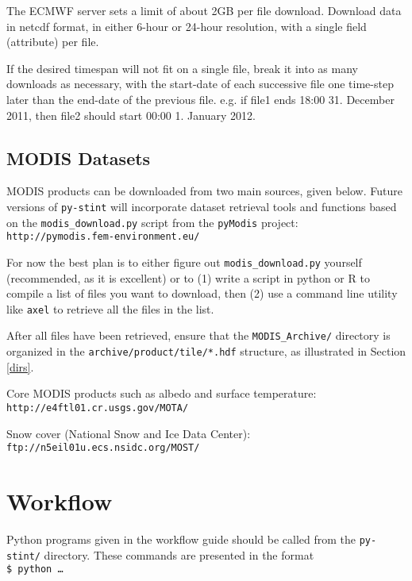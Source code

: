 \documentclass[twoside,a4paper]{refart}
\begin{document}
\attention
The ECMWF server sets a limit of about 2GB per file download.  Download data in netcdf format, in either 6-hour or 24-hour resolution, with a single field (attribute) per file. 

If the desired timespan will not fit on a single file, break it into as many downloads as necessary, with the start-date of each successive file one time-step later than the end-date of the previous file. e.g. if file1 ends 18:00 31. December 2011, then file2 should start 00:00 1. January 2012.

\subsection{MODIS Datasets}\label{modis}
MODIS products can be downloaded from two main sources, given below.  Future versions of \texttt{py-stint} will incorporate dataset retrieval tools and functions based on the \texttt{modis\_download.py} script from the \texttt{pyModis} project:
\texttt{http://pymodis.fem-environment.eu/}

For now the best plan is to either figure out \texttt{modis\_download.py} yourself (recommended, as it is excellent) or to (1) write a script in python or R to compile a list of files you want to download, then (2) use a command line utility like \texttt{axel} to retrieve all the files in the list.

After all files have been retrieved, ensure that the \texttt{MODIS\_Archive/} directory is organized in the \texttt{archive/product/tile/*.hdf} structure, as illustrated in Section \ref{dirs}. 

Core MODIS products such as albedo and surface temperature:\\
\texttt{http://e4ftl01.cr.usgs.gov/MOTA/}


Snow cover (National Snow and Ice Data Center):\\
\texttt{ftp://n5eil01u.ecs.nsidc.org/MOST/}

\newpage
\section{Workflow}\label{run}
Python programs given in the workflow guide should be called from the 
\texttt{py-stint/} directory.  These commands are presented in the format \\
\texttt{\$ python \ldots}
\end{document}
